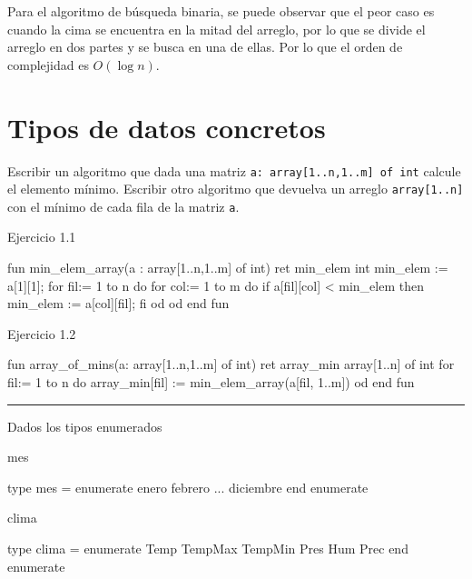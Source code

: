 Para el algoritmo de búsqueda binaria, se puede observar que el peor caso es cuando la cima se encuentra en la mitad del arreglo, por lo que se divide el arreglo en dos partes y se busca en una de ellas. Por lo que el orden de complejidad es $O(\log n)$.

\newpage
\section{Tipos de datos concretos}

Escribir un algoritmo que dada una matriz \texttt{a: array[1..n,1..m] of int} calcule el elemento mínimo. Escribir otro algoritmo que devuelva un arreglo \texttt{array[1..n]} con el mínimo de cada fila de la matriz \texttt{a}.

\begin{codebox}{Ejercicio 1.1}
\begin{pascallike}
fun min_elem_array(a : array[1..n,1..m] of int) ret min_elem int
    min_elem := a[1][1];
    for fil:= 1 to n do
        for col:= 1 to m do
            if a[fil][col] < min_elem then
                min_elem := a[col][fil];
            fi
        od
    od
end fun
\end{pascallike}
\end{codebox}

\begin{codebox}{Ejercicio 1.2}
\begin{pascallike}
fun array_of_mins(a: array[1..n,1..m] of int) ret array_min array[1..n] of int
    for fil:= 1 to n do
        array_min[fil] := min_elem_array(a[fil, 1..m])
    od
end fun
\end{pascallike}
\end{codebox}

\begin{center}
    \rule{\textwidth}{0.4pt}
\end{center}

Dados los tipos enumerados

\begin{codebox}{mes}
\begin{pascallike}
type mes = enumerate
            enero
            febrero
            ...
            diciembre
           end enumerate
\end{pascallike}
\end{codebox}

\begin{codebox}{clima}
\begin{pascallike}
type clima = enumerate
                Temp
                TempMax
                TempMin
                Pres
                Hum
                Prec
             end enumerate
\end{pascallike}
\end{codebox}

